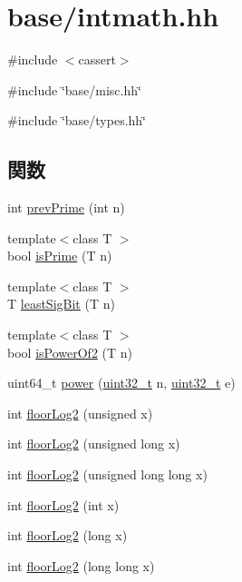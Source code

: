 \hypertarget{intmath_8hh}{
\section{base/intmath.hh}
\label{intmath_8hh}
}
{\ttfamily \#include $<$cassert$>$}\par
{\ttfamily \#include \char`\"{}base/misc.hh\char`\"{}}\par
{\ttfamily \#include \char`\"{}base/types.hh\char`\"{}}\par
\subsection*{関数}
\begin{DoxyCompactItemize}
\item 
int \hyperlink{intmath_8hh_a10cb95b0267273bc74bad625fd898a7a}{prevPrime} (int n)
\item 
{\footnotesize template$<$class T $>$ }\\bool \hyperlink{intmath_8hh_af3bac294b8a9bea0d769d31d69359d5b}{isPrime} (T n)
\item 
{\footnotesize template$<$class T $>$ }\\T \hyperlink{intmath_8hh_aedf2d3ae8ea4c0cad7f3b129194079f9}{leastSigBit} (T n)
\item 
{\footnotesize template$<$class T $>$ }\\bool \hyperlink{intmath_8hh_aa73a8269f3cc1853f96c7a9210f61f0e}{isPowerOf2} (T n)
\item 
uint64\_\-t \hyperlink{intmath_8hh_a4e6a30fd4eed8d942ab7fa676da00e69}{power} (\hyperlink{Type_8hh_a435d1572bf3f880d55459d9805097f62}{uint32\_\-t} n, \hyperlink{Type_8hh_a435d1572bf3f880d55459d9805097f62}{uint32\_\-t} e)
\item 
int \hyperlink{intmath_8hh_ad61f5307b84292529da332fee695614e}{floorLog2} (unsigned x)
\item 
int \hyperlink{intmath_8hh_a9796f3c77e4ea692eff841b1b0ffd3c5}{floorLog2} (unsigned long x)
\item 
int \hyperlink{intmath_8hh_a1aef59a86a50b9a145dde96ae65c21b7}{floorLog2} (unsigned long long x)
\item 
int \hyperlink{intmath_8hh_abd19f55c0889d4497e80d04c592a5a3f}{floorLog2} (int x)
\item 
int \hyperlink{intmath_8hh_aaa5523260849f943356b4ae7955d1384}{floorLog2} (long x)
\item 
int \hyperlink{intmath_8hh_a74b8ca802c979ca07b3f7bdddca9264d}{floorLog2} (long long x)

\end{DoxyCompactItemize}
